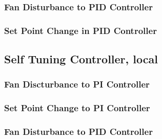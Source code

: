 \subsubsection{Fan Disturbance to PID Controller}
\begin{code}

\end{code}


\subsubsection{Set Point Change in PID Controller}
\begin{code}

\end{code}



\subsection{Self Tuning Controller, local}\label{selfcode_local}
\subsubsection{Fan Discturbance to PI Controller}
\begin{code}

\end{code}


\subsubsection{Set Point Change to PI Controller}
\begin{code}

\end{code}

\subsubsection{Fan Disturbance to PID Controller}
\begin{code}

\end{code}

